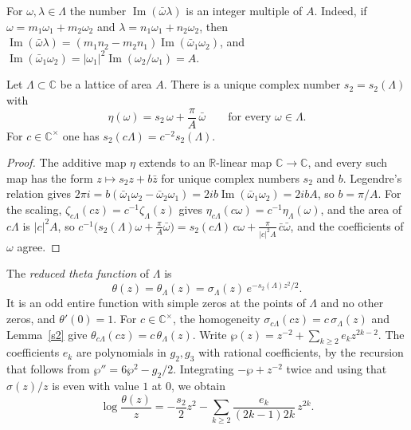 For $\omega,\lambda\in\Lambda$ the number $\operatorname{Im}(\bar\omega\lambda)$ is an integer multiple of $A$. Indeed, if $\omega=m_1\omega_1+m_2\omega_2$ and $\lambda=n_1\omega_1+n_2\omega_2$, then $\operatorname{Im}(\bar\omega\lambda)=(m_1n_2-m_2n_1)\operatorname{Im}(\bar\omega_1\omega_2)$, and $\operatorname{Im}(\bar\omega_1\omega_2)=\lvert\omega_1\rvert^2\operatorname{Im}(\omega_2/\omega_1)=A$.

\begin{lemma}\label{s2}
Let $\Lambda\subset\mathbb C$ be a lattice of area $A$. There is a unique complex number $s_2=s_2(\Lambda)$ with
\[
\eta(\omega)=s_2\,\omega+\frac\pi A\,\bar\omega\qquad\text{for every }\omega\in\Lambda .
\]
For $c\in\mathbb C^\times$ one has $s_2(c\Lambda)=c^{-2}s_2(\Lambda)$.
\end{lemma}

\begin{proof}
The additive map $\eta$ extends to an $\mathbb R$-linear map $\mathbb C\to\mathbb C$, and every such map has the form $z\mapsto s_2z+b\bar z$ for unique complex numbers $s_2$ and $b$. Legendre's relation gives $2\pi i=b(\bar\omega_1\omega_2-\bar\omega_2\omega_1)=2ib\operatorname{Im}(\bar\omega_1\omega_2)=2ibA$, so $b=\pi/A$. For the scaling, $\zeta_{c\Lambda}(cz)=c^{-1}\zeta_\Lambda(z)$ gives $\eta_{c\Lambda}(c\omega)=c^{-1}\eta_\Lambda(\omega)$, and the area of $c\Lambda$ is $\lvert c\rvert^2A$, so $c^{-1}\big(s_2(\Lambda)\omega+\frac\pi A\bar\omega\big)=s_2(c\Lambda)\,c\omega+\frac{\pi}{\lvert c\rvert^2A}\,\bar c\bar\omega$, and the coefficients of $\omega$ agree.
\end{proof}

The \emph{reduced theta function} of $\Lambda$ is
\[
\theta(z)=\theta_\Lambda(z)=\sigma_\Lambda(z)\,e^{-s_2(\Lambda)z^2/2}.
\]
It is an odd entire function with simple zeros at the points of $\Lambda$ and no other zeros, and $\theta'(0)=1$. For $c\in\mathbb C^\times$, the homogeneity $\sigma_{c\Lambda}(cz)=c\,\sigma_\Lambda(z)$ and Lemma~\ref{s2} give $\theta_{c\Lambda}(cz)=c\,\theta_\Lambda(z)$. Write $\wp(z)=z^{-2}+\sum_{k\ge2}e_kz^{2k-2}$. The coefficients $e_k$ are polynomials in $g_2,g_3$ with rational coefficients, by the recursion that follows from $\wp''=6\wp^2-g_2/2$. Integrating $-\wp+z^{-2}$ twice and using that $\sigma(z)/z$ is even with value $1$ at $0$, we obtain
\begin{equation}\label{logtheta}
\log\frac{\theta(z)}z=-\frac{s_2}2z^2-\sum_{k\ge2}\frac{e_k}{(2k-1)2k}\,z^{2k}.
\end{equation}

